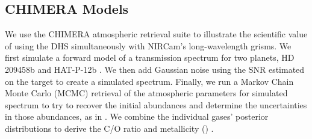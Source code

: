 \documentclass[iop]{emulateapj}
\begin{document}

\subsection{CHIMERA Models}\label{sec:models}


We use the CHIMERA atmospheric retrieval suite \citep{line2013chimera,line2014CtOsecE} to illustrate the scientific value of using the DHS simultaneously with NIRCam's long-wavelength grisms.
We first simulate a forward model of a transmission spectrum for two planets, HD 209458b \citep{henry00,charbonneau00} and HAT-P-12b \citep{hartman2009hatp12}.
We then add Gaussian noise using the SNR estimated on the target to create a simulated spectrum.
Finally, we run a Markov Chain Monte Carlo (MCMC) retrieval of the atmospheric parameters for simulated spectrum to try to recover the initial abundances and determine the uncertainties in those abundances, as in \citet{greene2016jwst_trans}.
We combine the individual gases' posterior distributions to derive the C/O ratio and metallicity (\citet{greene2016jwst_trans}) .


\end{document}
